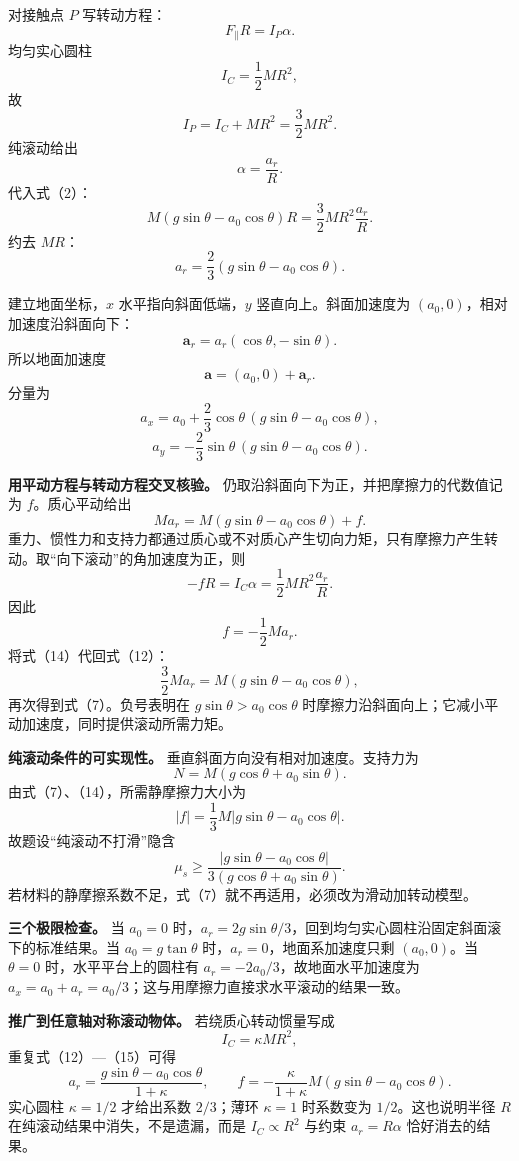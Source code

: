 \documentclass[12pt,a4paper,UTF8]{ctexart}
\begin{document}
对接触点 \(P\) 写转动方程： \[
F_{\parallel}R=I_P\alpha. \tag{2}
\] 均匀实心圆柱 \[
I_C=\frac12MR^2, \tag{3}
\] 故 \[
I_P=I_C+MR^2=\frac32MR^2. \tag{4}
\] 纯滚动给出 \[
\alpha=\frac{a_r}{R}. \tag{5}
\] 代入式（2）： \[
M(g\sin\theta-a_0\cos\theta)R
=\frac32MR^2\frac{a_r}{R}. \tag{6}
\] 约去 \(MR\)： \[
\boxed{a_r=\frac23(g\sin\theta-a_0\cos\theta)}. \tag{7}
\]

建立地面坐标，\(x\) 水平指向斜面低端，\(y\) 竖直向上。斜面加速度为
\((a_0,0)\)，相对加速度沿斜面向下： \[
\boldsymbol a_r=a_r(\cos\theta,-\sin\theta). \tag{8}
\] 所以地面加速度 \[
\boldsymbol a= (a_0,0)+\boldsymbol a_r. \tag{9}
\] 分量为 \[
\boxed{
a_x=a_0+\frac23\cos\theta\,
(g\sin\theta-a_0\cos\theta)
}, \tag{10}
\] \[
\boxed{
a_y=-\frac23\sin\theta\,
(g\sin\theta-a_0\cos\theta)
}. \tag{11}
\]

\textbf{用平动方程与转动方程交叉核验。}
仍取沿斜面向下为正，并把摩擦力的代数值记为 \(f\)。质心平动给出 \[
Ma_r=M(g\sin\theta-a_0\cos\theta)+f. \tag{12}
\]
重力、惯性力和支持力都通过质心或不对质心产生切向力矩，只有摩擦力产生转动。取``向下滚动''的角加速度为正，则
\[
-fR=I_C\alpha
=\frac12MR^2\frac{a_r}{R}. \tag{13}
\] 因此 \[
f=-\frac12Ma_r. \tag{14}
\] 将式（14）代回式（12）： \[
\frac32Ma_r=M(g\sin\theta-a_0\cos\theta), \tag{15}
\] 再次得到式（7）。负号表明在 \(g\sin\theta>a_0\cos\theta\)
时摩擦力沿斜面向上；它减小平动加速度，同时提供滚动所需力矩。

\textbf{纯滚动条件的可实现性。} 垂直斜面方向没有相对加速度。支持力为 \[
N=M(g\cos\theta+a_0\sin\theta). \tag{16}
\] 由式（7）、（14），所需静摩擦力大小为 \[
|f|=\frac13M|g\sin\theta-a_0\cos\theta|. \tag{17}
\] 故题设``纯滚动不打滑''隐含 \[
\mu_s\ge
\frac{|g\sin\theta-a_0\cos\theta|}
{3(g\cos\theta+a_0\sin\theta)}. \tag{18}
\] 若材料的静摩擦系数不足，式（7）就不再适用，必须改为滑动加转动模型。

\textbf{三个极限检查。} 当 \(a_0=0\)
时，\(a_r=2g\sin\theta/3\)，回到均匀实心圆柱沿固定斜面滚下的标准结果。当
\(a_0=g\tan\theta\) 时，\(a_r=0\)，地面系加速度只剩 \((a_0,0)\)。当
\(\theta=0\) 时，水平平台上的圆柱有 \(a_r=-2a_0/3\)，故地面水平加速度为
\(a_x=a_0+a_r=a_0/3\)；这与用摩擦力直接求水平滚动的结果一致。

\textbf{推广到任意轴对称滚动物体。} 若绕质心转动惯量写成 \[
I_C=\kappa MR^2, \tag{19}
\] 重复式（12）---（15）可得 \[
a_r=\frac{g\sin\theta-a_0\cos\theta}{1+\kappa},
\qquad
f=-\frac{\kappa}{1+\kappa}M
(g\sin\theta-a_0\cos\theta). \tag{20}
\] 实心圆柱 \(\kappa=1/2\) 才给出系数 \(2/3\)；薄环 \(\kappa=1\)
时系数变为 \(1/2\)。这也说明半径 \(R\)
在纯滚动结果中消失，不是遗漏，而是 \(I_C\propto R^2\) 与约束
\(a_r=R\alpha\) 恰好消去的结果。
\end{document}
